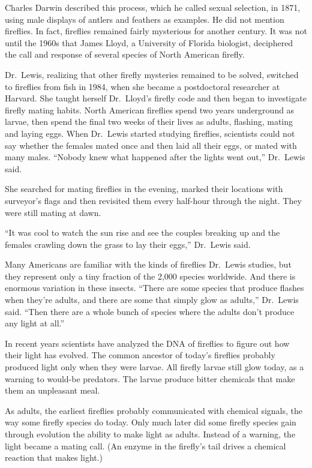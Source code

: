 ﻿\documentclass[12pt]{article}
\begin{document}
Charles Darwin described this process, which he called sexual selection, in 1871, using male
displays of antlers and feathers as examples. He did not mention fireflies. In fact, fireflies
remained fairly mysterious for another century. It was not until the 1960s that James Lloyd, a
University of Florida biologist, deciphered the call and response of several species of North
American firefly.

Dr.~Lewis, realizing that other firefly mysteries remained to be solved, switched to fireflies from
fish in 1984, when she became a postdoctoral researcher at Harvard. She taught herself Dr.~Lloyd's
firefly code and then began to investigate firefly mating habits. North American fireflies spend two
years underground as larvae, then spend the final two weeks of their lives as adults, flashing,
mating and laying eggs. When Dr.~Lewis started studying fireflies, scientists could not say whether
the females mated once and then laid all their eggs, or mated with many males. ``Nobody knew what
happened after the lights went out,'' Dr.~Lewis said.

She searched for mating fireflies in the evening, marked their locations with surveyor's flags and
then revisited them every half-hour through the night. They were still mating at dawn.

``It was cool to watch the sun rise and see the couples breaking up and the females crawling down
the grass to lay their eggs,'' Dr.~Lewis said.

Many Americans are familiar with the kinds of fireflies Dr.~Lewis studies, but they represent only a
tiny fraction of the 2,000 species worldwide. And there is enormous variation in these insects.
``There are some species that produce flashes when they're adults, and there are some that simply
glow as adults,'' Dr.~Lewis said. ``Then there are a whole bunch of species where the adults don't
produce any light at all.''

In recent years scientists have analyzed the DNA of fireflies to figure out how their light has
evolved. The common ancestor of today's fireflies probably produced light only when they were
larvae. All firefly larvae still glow today, as a warning to would-be predators. The larvae produce
bitter chemicals that make them an unpleasant meal.

As adults, the earliest fireflies probably communicated with chemical signals, the way some firefly
species do today. Only much later did some firefly species gain through evolution the ability to
make light as adults. Instead of a warning, the light became a mating call. (An enzyme in the
firefly's tail drives a chemical reaction that makes light.)
\end{document}
